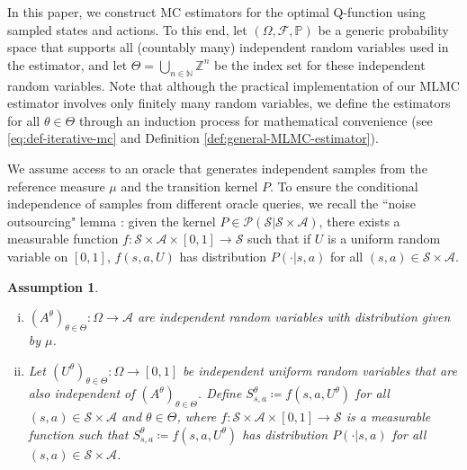 \documentclass[11pt]{article}
\numberwithin{equation}{section}
\newtheorem{assumption}{Assumption}
\theoremstyle{definition}
\theoremstyle{remark}
\def\cA{\mathcal{A}}
\def\cS{\mathcal{S}}
\def\N{{\mathbb{N}}}
\def\Z{{\mathbb{Z}}}
\newcommand{\citep}{\cite}
\begin{document}
  
 In this paper, we 
 construct MC estimators 
for the optimal Q-function
using   sampled states and actions. 
To this end, let 
$(\Omega,\mathcal F, \mathbb P)$
be a generic probability space that 
 supports all  (countably many) independent random variables used in the   estimator,
 and 
let 
$\Theta = \bigcup_{n \in \N} \Z^n$
be the index set for these independent random variables. 
Note that although the practical implementation of our MLMC estimator involves only finitely many random variables, we define the estimators for all $\theta\in \Theta$
 through an induction process for mathematical convenience
 (see \eqref{eq:def-iterative-mc} and Definition \ref{def:general-MLMC-estimator}).



We assume access to an oracle that generates  independent samples  from the reference measure 
$\mu$
  and the transition kernel 
$P$. 
To ensure the conditional independence of samples from different oracle queries,
 we recall 
the ``noise outsourcing" lemma
\citep[Lemma 2.22]{kallenberg2002foundations}:
given the   kernel $P\in \mathcal P(\cS|\cS\times \cA)$, 
there exists a 
measurable function $f:\cS\times \cA\times [0,1]\to \cS$
such that if  
$U$ is a uniform random variable on $[0,1]$,
$f(s,a, U) $ has   distribution $P(\cdot|s,a)$
for all 
  $(s,a)\in \cS\times \cA$.


\begin{assumption}
    \label{assumption:random-variables}
   \begin{enumerate}[(i)]
       \item\label{item:A_sample}
       $(A ^{\theta})_{\theta \in \Theta}:\Omega\to \cA$ are independent random variables with distribution given by $\mu$.
       \item \label{item:S_sample}
              
       Let $(U^\theta)_{\theta\in \Theta}:\Omega\to [0,1]$ be independent uniform random variables   that are also independent of $(A ^{\theta})_{\theta \in \Theta}$.
       Define
       $S ^{\theta}_{s,a} \coloneqq f(s,a,U^\theta)$
       for all  $(s,a)\in \cS\times \cA$ and $\theta\in \Theta$,
       where $f: \cS\times \cA\times [0,1] \to \cS$
is a measurable function such that 
$S^\theta_{s,a}\coloneqq f(s,a,U^\theta)$ has     distribution $P(\cdot|s,a)$
for all $(s,a)\in \cS\times \cA$.


       
    
   \end{enumerate}
       
    
    
\end{assumption}
\end{document}
